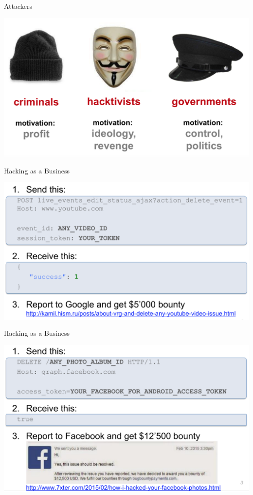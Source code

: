 \documentclass{beamer}
\begin{document}
\begin{frame}{Attackers}
  \begin{center} 
      \includegraphics[width=1\linewidth]{attackers.png} 
    \end{center}
\end{frame}

\begin{frame}{Hacking as a Business}
\begin{center}
\includegraphics[width=0.8\linewidth]{google-bounty.png}
\end{center}
\end{frame}

\begin{frame}{Hacking as a Business}
\begin{center}
\includegraphics[width=0.8\linewidth]{facebook-bounty.png}
\end{center}
\end{frame}
\end{document}
